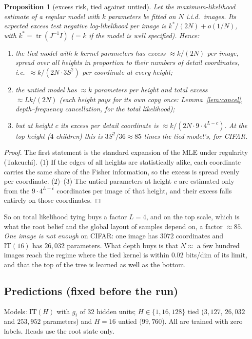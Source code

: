 \documentclass[11pt]{article}
\newtheorem{proposition}[theorem]{Proposition}
\theoremstyle{definition}
\begin{document}
\begin{proposition}[excess risk, tied against untied]\label{prop:wilks}
Let the maximum-likelihood estimate of a regular model with $k$ parameters be fitted on $N$ i.i.d.\ images.
Its expected excess test negative log-likelihood per image is $k^*/(2N)+o(1/N)$, with
$k^*=\operatorname{tr}(J^{-1}I)$ ($=k$ if the model is well specified). Hence:
\begin{enumerate}
\item the tied model with $k$ kernel parameters has excess $\approx k/(2N)$ per image, spread over all heights in
proportion to their numbers of detail coordinates, i.e.\ $\approx k/(2N\cdot 3S^2)$ per coordinate at \emph{every}
height;
\item the untied model has $\approx k$ parameters per height and total excess $\approx Lk/(2N)$ (each height pays
for its own copy once: Lemma~\ref{lem:cancel}, depth--frequency cancellation, for the total likelihood);
\item but at height $c$ its excess per detail coordinate is $\approx k/(2N\cdot9\cdot4^{L-c})$. At the top height
($4$ children) this is $3S^2/36\approx85$ times the tied model's, for CIFAR.
\end{enumerate}
\end{proposition}
\begin{proof}
The first statement is the standard expansion of the MLE under regularity (Takeuchi). (1) If the edges of all
heights are statistically alike, each coordinate carries the same share of the Fisher information, so the
excess is spread evenly per coordinate. (2)--(3) The untied parameters at height $c$ are estimated only from the
$9\cdot4^{L-c}$ coordinates per image of that height, and their excess falls entirely on those coordinates.
\end{proof}

\noindent So on total likelihood tying buys a factor $L=4$, and on the top scale, which is what the root belief
and the global layout of samples depend on, a factor $\approx85$. \emph{One image is not enough} on CIFAR:
one image has $3072$ coordinates and $\mathrm{IT}(16)$ has $26{,}032$ parameters. What depth buys is that
$N\approx$ a few hundred images reach the regime where the tied kernel is within $0.02$ bits/dim of its limit,
and that the top of the tree is learned as well as the bottom.

\subsection{Predictions (fixed before the run)}\label{sec:cifar-pred}
Models: $\mathrm{IT}(H)$ with $g_i$ of $32$ hidden units; $H\in\{1,16,128\}$ tied ($3{,}127$, $26{,}032$ and
$253{,}952$ parameters) and $H=16$ untied ($99{,}760$). All are trained with zero labels. Heads use the root state
only.
\end{document}
